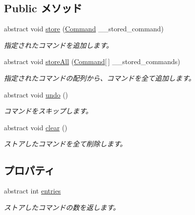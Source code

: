 \subsection*{Public メソッド}
\begin{DoxyCompactItemize}
\item 
abstract void \hyperlink{classlazurite_1_1pattern_1_1commanding_1_1_macro_command_a3c48d7d5dc8de76e3164794c9ac2f66f}{store} (\hyperlink{classlazurite_1_1pattern_1_1commanding_1_1_command}{Command} \_\-\_\-stored\_\-command)
\begin{DoxyCompactList}\small\item\em 指定されたコマンドを追加します。 \item\end{DoxyCompactList}\item 
abstract void \hyperlink{classlazurite_1_1pattern_1_1commanding_1_1_macro_command_afa0d8581adff629f311bd109de0657b5}{storeAll} (\hyperlink{classlazurite_1_1pattern_1_1commanding_1_1_command}{Command}\mbox{[}$\,$\mbox{]} \_\-\_\-stored\_\-commands)
\begin{DoxyCompactList}\small\item\em 指定されたコマンドの配列から、コマンドを全て追加します。 \item\end{DoxyCompactList}\item 
abstract void \hyperlink{classlazurite_1_1pattern_1_1commanding_1_1_macro_command_ae042e0f0207269ebb1c201ea39b860fb}{undo} ()
\begin{DoxyCompactList}\small\item\em コマンドをスキップします。 \item\end{DoxyCompactList}\item 
abstract void \hyperlink{classlazurite_1_1pattern_1_1commanding_1_1_macro_command_a1ea80d83082f79545609f0c73bda0b7a}{clear} ()
\begin{DoxyCompactList}\small\item\em ストアしたコマンドを全て削除します。 \item\end{DoxyCompactList}\end{DoxyCompactItemize}
\subsection*{プロパティ}
\begin{DoxyCompactItemize}
\item 
abstract int \hyperlink{classlazurite_1_1pattern_1_1commanding_1_1_macro_command_ad07b059cd5dce67ac04b21290c29e625}{entries}
\begin{DoxyCompactList}\small\item\em ストアしたコマンドの数を返します。 \item\end{DoxyCompactList}\end{DoxyCompactItemize}


